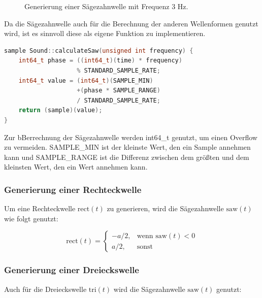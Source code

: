 \begin{figure}[h]
\begin{tikzpicture}
    \end{tikzpicture}

    \caption{Generierung einer Sägezahnwelle mit Frequenz 3 Hz.}
    \label{fig:saw_generation}

\end{figure}

Da die Sägezahnwelle auch für die Berechnung der anderen 
Wellenformen genutzt wird, ist es sinnvoll diese als eigene 
Funktion zu implementieren.

\begin{lstlisting}[language=C++, 
                       frame=single, 
                       caption={Generierung einer Sägezahnwelle im Code},
                       captionpos=b]
sample Sound::calculateSaw(unsigned int frequency) {
    int64_t phase = ((int64_t)(time) * frequency) 
                    % STANDARD_SAMPLE_RATE;
    int64_t value = (int64_t)(SAMPLE_MIN) 
                    +(phase * SAMPLE_RANGE) 
                    / STANDARD_SAMPLE_RATE;
    return (sample)(value);
}
\end{lstlisting}

Zur bBerrechnung der Sägezahnwelle werden int64\_t genutzt, um einen Overflow zu vermeiden.
SAMPLE\_MIN ist der kleinste Wert, den ein Sample annehmen kann und SAMPLE\_RANGE
ist die Differenz zwischen dem größten und dem kleinsten Wert, den ein Wert 
annehmen kann.

\subsubsection{Generierung einer Rechteckwelle}

Um eine Rechteckwelle $\text{rect}(t)$ zu generieren, wird die 
Sägezahnwelle $\text{saw}(t)$ wie folgt genutzt: 

\begin{equation}
    \text{rect}(t) = \begin{cases}
        -a/2, & \text{wenn } \text{saw}(t) < 0 \\
        a/2, & \text{sonst}
    \end{cases}
\end{equation}

\subsubsection{Generierung einer Dreieckswelle}

Auch für die Dreieckswelle $\text{tri}(t)$ wird die 
Sägezahnwelle $\text{saw}(t)$ genutzt:

